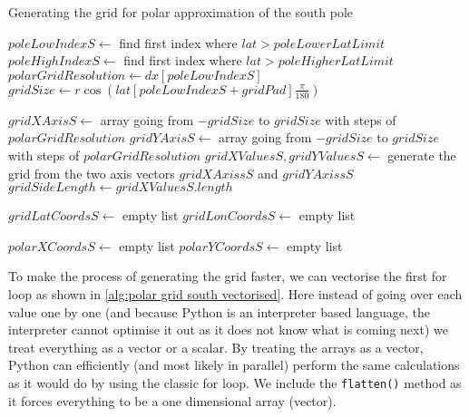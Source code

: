 \begin{algorithm}[htb]
    \caption{Generating the grid for polar approximation of the south pole}
    \label{alg:polar grid south}
    $poleLowIndexS \leftarrow $ find first index where $lat > poleLowerLatLimit$ \;
    $poleHighIndexS \leftarrow $ find first index where $lat > poleHigherLatLimit$ \;
    $polarGridResolution \leftarrow dx[poleLowIndexS] $ 
    $gridSize \leftarrow r \cos(lat[poleLowIndexS + gridPad] \frac{\pi}{180})$ 
    \BlankLine

    $gridXAxisS \leftarrow $ array going from $-gridSize$ to $gridSize$ with steps of $polarGridResolution$ \;
    $gridYAxisS \leftarrow $ array going from $-gridSize$ to $gridSize$ with steps of $polarGridResolution$ \;
    $gridXValuesS, gridYValuesS \leftarrow $ generate the grid from the two axis vectors $gridXAxissS$ and $gridYAxissS$ \;
    $gridSideLength \leftarrow gridXValuesS.length $ 
    \BlankLine 

    $gridLatCoordsS \leftarrow $ empty list \;
    $gridLonCoordsS \leftarrow $ empty list \;

    \BlankLine
    $polarXCoordsS \leftarrow$ empty list \;
    $polarYCoordsS \leftarrow$ empty list \;
\end{algorithm}

To make the process of generating the grid faster, we can vectorise the first for loop as shown in \autoref{alg:polar grid south vectorised}. Here instead of going over each value one by one 
(and because Python is an interpreter based language, the interpreter cannot optimise it out as it does not know what is coming next) we treat everything as a vector or a scalar. By treating the 
arrays as a vector, Python can efficiently (and most likely in parallel) perform the same calculations as it would do by using the classic for loop. We include the \texttt{flatten()} method as 
it forces everything to be a one dimensional array (vector).

